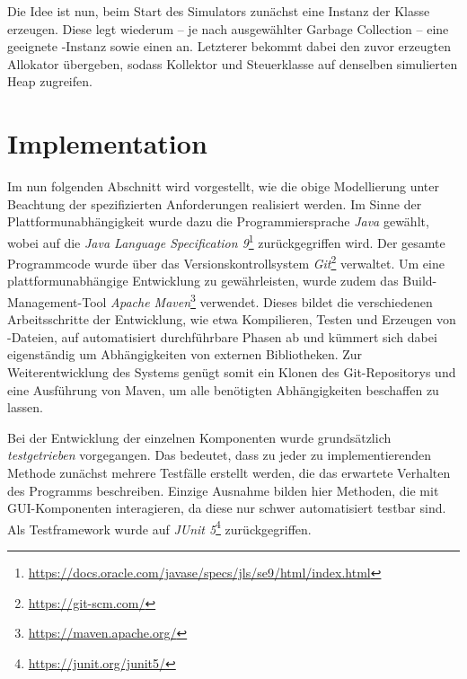Die Idee ist nun, beim Start des Simulators zunächst eine Instanz der Klasse  erzeugen.
Diese legt wiederum -- je nach ausgewählter Garbage Collection -- eine geeignete -Instanz sowie einen  an.
Letzterer bekommt dabei den zuvor erzeugten Allokator übergeben, sodass Kollektor und Steuerklasse auf denselben simulierten Heap zugreifen.

\section{Implementation}
\label{sec:implementation}
Im nun folgenden Abschnitt wird vorgestellt, wie die obige Modellierung unter Beachtung der spezifizierten Anforderungen realisiert werden.
Im Sinne der Plattformunabhängigkeit wurde dazu die Programmiersprache \textit{Java} gewählt, wobei auf die \textit{Java Language Specification 9}\footnote{\url{https://docs.oracle.com/javase/specs/jls/se9/html/index.html}} zurückgegriffen wird.
Der gesamte Programmcode wurde über das Versionskontrollsystem \textit{Git}\footnote{\url{https://git-scm.com/}} verwaltet.
Um eine plattformunabhängige Entwicklung zu gewährleisten, wurde zudem das Build-Management-Tool \textit{Apache Maven}\footnote{\url{https://maven.apache.org/}} verwendet.
Dieses bildet die verschiedenen Arbeitsschritte der Entwicklung, wie etwa Kompilieren, Testen und Erzeugen von -Dateien, auf automatisiert durchführbare Phasen ab und kümmert sich dabei eigenständig um Abhängigkeiten von externen Bibliotheken.
Zur Weiterentwicklung des Systems genügt somit ein Klonen des Git-Repositorys und eine Ausführung von Maven, um alle benötigten Abhängigkeiten beschaffen zu lassen.

Bei der Entwicklung der einzelnen Komponenten wurde grundsätzlich \textit{testgetrieben} vorgegangen.
Das bedeutet, dass zu jeder zu implementierenden Methode zunächst mehrere Testfälle erstellt werden, die das erwartete Verhalten des Programms beschreiben.
Einzige Ausnahme bilden hier Methoden, die mit GUI-Komponenten interagieren, da diese nur schwer automatisiert testbar sind.
Als Testframework wurde auf \textit{JUnit 5}\footnote{\url{https://junit.org/junit5/}} zurückgegriffen.

